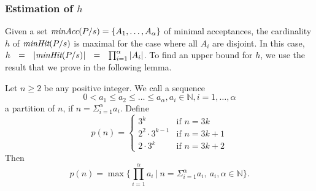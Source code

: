 \subsubsection*{Estimation of $h$}
Given a set $\text{\it minAcc}(P/s) = \{ A_1,\dots, A_\alpha \}$ of   minimal
acceptances, the cardinality $h$ of $\text{\it minHit}(P/s)$ is maximal for the case
where all $A_i$ are disjoint. In this case,  $h~~=~~|\text{\it minHit}(P/s)|~~=~~
\prod_{i=1}^\alpha|A_i|$. To find an upper bound for $h$, we use the result
that we prove in the following lemma.
%
\begin{lemma}\label{lemma:minhitmax}
Let $n\ge 2$ be any positive integer. We call a sequence
%
$$0 < a_1\le a_2\le \ldots\le  a_{\alpha}, a_i\in \mathbb{N}, i=1,\dots, \alpha$$
%
a partition of $n$, if $n=\Sigma_{i=1}^{\alpha}a_i$. Define
%
$$p(n)=\begin{cases} 3^k &\text{if}\,\, n=3k\\ 2^2\cdot 3^{k-1} &\text{if}\,\, n=3k+1\\2\cdot 3^{k} &\text{if}\,\, n=3k+2\end{cases}$$
Then  $$p(n)=\max\big\{\prod_{i=1}^{\alpha}a_i~|~n=\Sigma_{i=1}^{\alpha}a_i,\ a_i,
\alpha\in \mathbb{N}\big\}.$$
%
\end{lemma}
